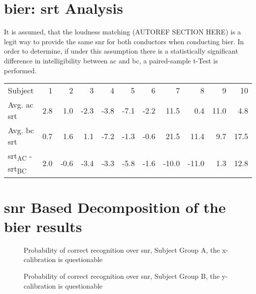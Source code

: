 \section{\gls{bier}: \gls{srt} Analysis}

It is assumed, that the loudness matching (AUTOREF SECTION HERE) is a legit way to provide the same \gls{snr} for both conductors when conducting \gls{bier}.
In order to determine, if under this assumption there is a statistically significant difference in intelligibility between \gls{ac} and \gls{bc}, a paired-sample t-Test is performed.

\begin{table}[H]
\begin{tabular}{lrrrrrrrrrr}
Subject     & 1   & 2    & 3    & 4    & 5    & 6    & 7     & 8     & 9    & 10   \\
Avg. \gls{ac} \gls{srt} & 2.8 & 1.0  & -2.3 & -3.8 & -7.1 & -2.2 & 11.5  & 0.4   & 11.0 & 4.8  \\
Avg. \gls{bc} \gls{srt} & 0.7 & 1.6  & 1.1  & -7.2 & -1.3 & -0.6 & 21.5  & 11.4  & 9.7  & 17.5 \\
\gls{srt}\textsubscript{AC} - \gls{srt}\textsubscript{BC}  & 2.0 & -0.6 & -3.4 & -3.3 & -5.8 & -1.6 & -10.0 & -11.0 & 1.3  & 12.8
\end{tabular}
\end{table}

\section{\gls{snr} Based Decomposition of the \gls{bier} results}

\begin{figure}[H]
\centering

\caption{Probability of correct recognition over \gls{snr}, Subject Group A, the x-calibration is questionable}
\label{fig:group_A_decomp}
\end{figure}


\begin{figure}[H]
\centering

\caption{Probability of correct recognition over \gls{snr}, Subject Group B, the y-calibration is questionable}
\label{fig:group_B_decomp}
\end{figure}

